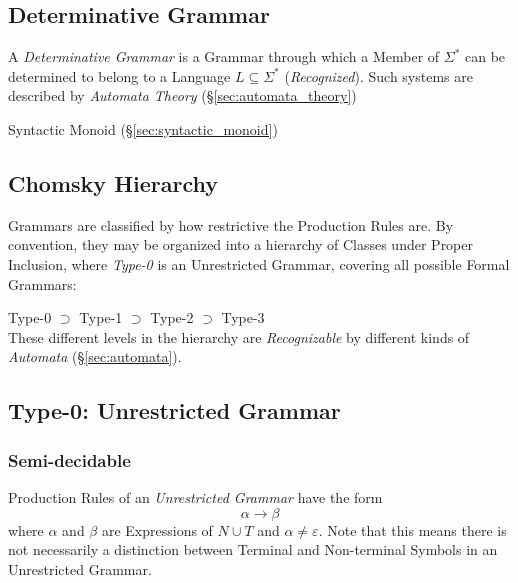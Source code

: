 \subsection{Determinative Grammar}\label{sec:determinative_grammar}

A \emph{Determinative Grammar} is a Grammar through which a Member of
$\Sigma^*$ can be determined to belong to a Language $L \subseteq
\Sigma^*$ (\emph{Recognized}). Such systems are described by
\emph{Automata Theory} (\S\ref{sec:automata_theory})

Syntactic Monoid (\S\ref{sec:syntactic_monoid})



\subsection{Chomsky Hierarchy}\label{sec:chomsky_hierarchy}
\cite{chomsky56}

Grammars are classified by how restrictive the Production Rules are.
By convention, they may be organized into a hierarchy of Classes under
Proper Inclusion, where \emph{Type-0} is an Unrestricted Grammar,
covering all possible Formal Grammars:

    Type-0 $\supset$ Type-1 $\supset$ Type-2 $\supset$ Type-3 \\
These different levels in the hierarchy are \emph{Recognizable} by
different kinds of \emph{Automata} (\S\ref{sec:automata}).



\subsection{Type-0: Unrestricted Grammar}\label{sec:unrestricted_grammar}

\subsubsection{Semi-decidable}\label{sec:semidecidable}

Production Rules of an \emph{Unrestricted Grammar} have the form
\[
    \alpha \rightarrow \beta
\]
where $\alpha$ and $\beta$ are Expressions of $N \cup T$ and $\alpha
\neq \varepsilon$. Note that this means there is not necessarily a
distinction between Terminal and Non-terminal Symbols in an
Unrestricted Grammar.

